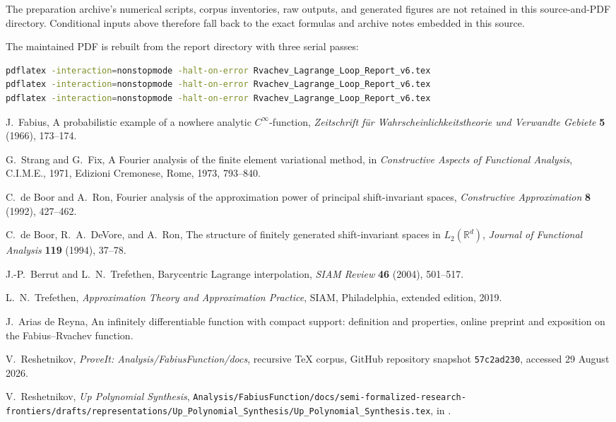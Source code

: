 \documentclass[11pt,oneside]{book}
\newcommand{\RepoCommit}{\texttt{57c2ad230}}%
\theoremstyle{definition}
\theoremstyle{remark}
\begin{document}
The preparation archive's numerical scripts, corpus inventories, raw outputs, and generated
figures are not retained in this source-and-PDF directory.  Conditional inputs above therefore
fall back to the exact formulas and archive notes embedded in this source.

The maintained PDF is rebuilt from the report directory with three serial passes:
\begin{lstlisting}[language=bash]
pdflatex -interaction=nonstopmode -halt-on-error Rvachev_Lagrange_Loop_Report_v6.tex
pdflatex -interaction=nonstopmode -halt-on-error Rvachev_Lagrange_Loop_Report_v6.tex
pdflatex -interaction=nonstopmode -halt-on-error Rvachev_Lagrange_Loop_Report_v6.tex
\end{lstlisting}

\backmatter
\begin{thebibliography}{99}

J.~Fabius,
\newblock A probabilistic example of a nowhere analytic \(C^\infty\)-function,
\newblock \emph{Zeitschrift f\"ur Wahrscheinlichkeitstheorie und Verwandte Gebiete} \textbf{5} (1966), 173--174.

G.~Strang and G.~Fix,
\newblock A Fourier analysis of the finite element variational method,
\newblock in \emph{Constructive Aspects of Functional Analysis}, C.I.M.E., 1971, Edizioni Cremonese, Rome, 1973, 793--840.

C.~de Boor and A.~Ron,
\newblock Fourier analysis of the approximation power of principal shift-invariant spaces,
\newblock \emph{Constructive Approximation} \textbf{8} (1992), 427--462.

C.~de Boor, R.~A.~DeVore, and A.~Ron,
\newblock The structure of finitely generated shift-invariant spaces in \(L_2(\mathbb R^d)\),
\newblock \emph{Journal of Functional Analysis} \textbf{119} (1994), 37--78.

J.-P.~Berrut and L.~N.~Trefethen,
\newblock Barycentric Lagrange interpolation,
\newblock \emph{SIAM Review} \textbf{46} (2004), 501--517.

L.~N.~Trefethen,
\newblock \emph{Approximation Theory and Approximation Practice},
\newblock SIAM, Philadelphia, extended edition, 2019.

J.~Arias de Reyna,
\newblock An infinitely differentiable function with compact support: definition and properties,
\newblock online preprint and exposition on the Fabius--Rvachev function.

V.~Reshetnikov,
\newblock \emph{ProveIt: Analysis/FabiusFunction/docs}, recursive TeX corpus,
\newblock GitHub repository snapshot \RepoCommit, accessed 29 August 2026.

V.~Reshetnikov,
\newblock \emph{Up Polynomial Synthesis},
\newblock
\nolinkurl{Analysis/FabiusFunction/docs/semi-formalized-research-frontiers/drafts/representations/Up_Polynomial_Synthesis/Up_Polynomial_Synthesis.tex},
in \cite{ProveItCorpus}.

\end{thebibliography}
\end{document}
